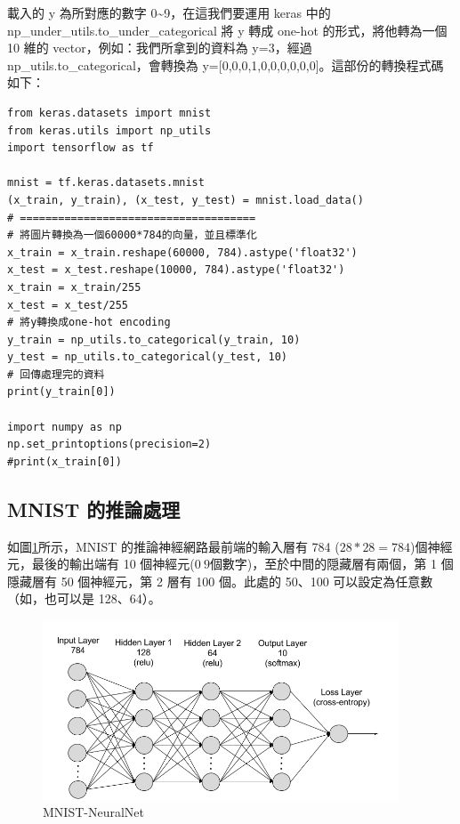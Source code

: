 \documentclass[a4paper,12pt]{article}
\begin{document}
\begin{enumerate}
載入的 y 為所對應的數字 0\textasciitilde{}9，在這我們要運用 keras 中的 np\_under\_utils.to\_under\_categorical 將 y 轉成 one-hot 的形式，將他轉為一個 10 維的 vector，例如：我們所拿到的資料為 y=3，經過 np\_utils.to\_categorical，會轉換為 y=[0,0,0,1,0,0,0,0,0,0]。這部份的轉換程式碼如下：\\
\lstset{breaklines=true,language=Python,label= ,caption= ,captionpos=b,numbers=none}
\begin{lstlisting}
from keras.datasets import mnist
from keras.utils import np_utils
import tensorflow as tf

mnist = tf.keras.datasets.mnist
(x_train, y_train), (x_test, y_test) = mnist.load_data()
# =====================================
# 將圖片轉換為一個60000*784的向量，並且標準化
x_train = x_train.reshape(60000, 784).astype('float32')
x_test = x_test.reshape(10000, 784).astype('float32')
x_train = x_train/255
x_test = x_test/255
# 將y轉換成one-hot encoding
y_train = np_utils.to_categorical(y_train, 10)
y_test = np_utils.to_categorical(y_test, 10)
# 回傳處理完的資料
print(y_train[0])

import numpy as np
np.set_printoptions(precision=2)
#print(x_train[0])
\end{lstlisting}
\end{enumerate}

\subsection{MNIST 的推論處理}
\label{sec:org3f28b51}

如圖\ref{fig:MNIST-NeuralNet}所示，MNIST 的推論神經網路最前端的輸入層有 784 (\(28*28=784\))個神經元，最後的輸出端有 10 個神經元(\(0~9\)個數字)，至於中間的隠藏層有兩個，第 1 個隱藏層有 50 個神經元，第 2 層有 100 個。此處的 50、100 可以設定為任意數（如，也可以是 128、64）。\\
\begin{figure}[htbp]
\centering
\includegraphics[width=400px]{images/MNIST-CNN.png}
\caption{\label{fig:MNIST-NeuralNet}MNIST-NeuralNet}
\end{figure}
\end{document}
